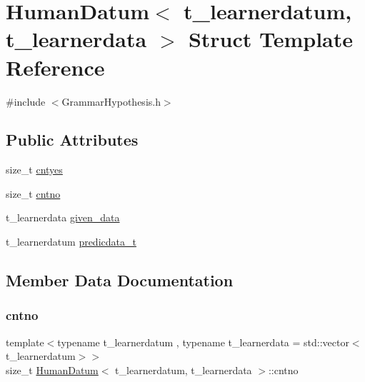 \hypertarget{struct_human_datum}{}\section{Human\+Datum$<$ t\+\_\+learnerdatum, t\+\_\+learnerdata $>$ Struct Template Reference}
\label{struct_human_datum}


{\ttfamily \#include $<$Grammar\+Hypothesis.\+h$>$}

\subsection*{Public Attributes}
\begin{DoxyCompactItemize}
\item 
size\+\_\+t \hyperlink{struct_human_datum_a3569e7634ea9badbe48105cb3a4e5800}{cntyes}
\item 
size\+\_\+t \hyperlink{struct_human_datum_a713ec5993bc2a348a73f292865a6ddcf}{cntno}
\item 
t\+\_\+learnerdata \hyperlink{struct_human_datum_aab13b229dfedb8c2466f47a58e710431}{given\+\_\+data}
\item 
t\+\_\+learnerdatum \hyperlink{struct_human_datum_a1c46fa659d01c8108fc694b4332836ff}{predicdata\+\_\+t}
\end{DoxyCompactItemize}


\subsection{Member Data Documentation}
\mbox{\label{struct_human_datum_a713ec5993bc2a348a73f292865a6ddcf}} 
\subsubsection{\texorpdfstring{cntno}{cntno}}
{\footnotesize\ttfamily template$<$typename t\+\_\+learnerdatum , typename t\+\_\+learnerdata  = std\+::vector$<$t\+\_\+learnerdatum$>$$>$ \\
size\+\_\+t \hyperlink{struct_human_datum}{Human\+Datum}$<$ t\+\_\+learnerdatum, t\+\_\+learnerdata $>$\+::cntno}

\mbox{\label{struct_human_datum_a3569e7634ea9badbe48105cb3a4e5800}} 
